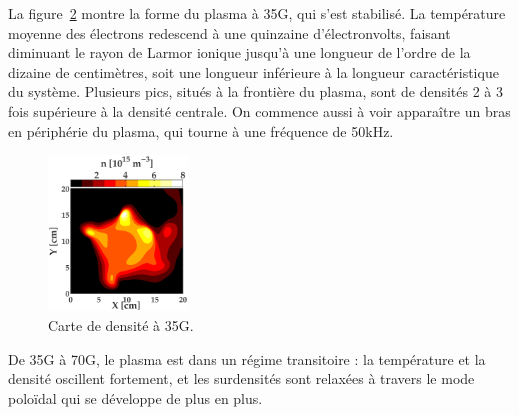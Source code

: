 \begin{refsection}
\begin{figure}[htbp]
    \label{4-CybeleVarMag-2}
\end{figure}
La figure~\ref{4-CybeleVarMag8} montre la forme du plasma à 35G, qui s'est
stabilisé. La température moyenne des électrons redescend à une quinzaine
d'électronvolts, faisant diminuant le rayon de Larmor ionique jusqu'à une
longueur de l'ordre de la dizaine de centimètres, soit une longueur inférieure à
la longueur caractéristique du système.
Plusieurs pics, situés à la frontière du plasma, sont de densités 2 à 3 fois
supérieure à la densité centrale. On commence aussi à voir apparaître un bras en
périphérie du plasma, qui tourne à une fréquence de 50kHz. 
\begin{figure}[!htbp]
\centering
\includegraphics[width=0.33\textwidth]{figures/4-CybeleVarMag8.eps}
{\caption{Carte de densité à 35G.}
\label{4-CybeleVarMag8}}
\end{figure}

De 35G à 70G, le plasma est dans un régime transitoire : la température
et la densité oscillent fortement, et les surdensités sont relaxées à travers 
le mode poloïdal qui se développe de plus en plus.

\end{refsection}

